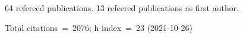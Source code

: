 64 refereed publications. 13 refeered publications as first author.

Total citations~=~2076; h-index~=~23 (2021-10-26)